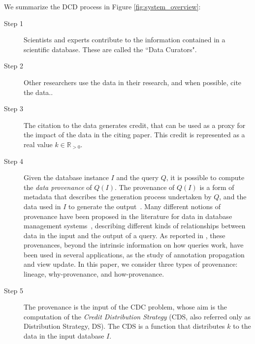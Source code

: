We summarize the DCD process in Figure \ref{fig:system_overview}:
\begin{description}
	\item[Step 1] Scientists and experts contribute to 
	the information contained in a scientific database.  These are called the ``Data Curators".  
	
	\item[Step 2] Other researchers use the data in their research, and when possible, cite the data..  
	\item[Step 3] The citation to the data generates credit, that can be used as a proxy for the impact of the data in the citing paper. This credit is represented as a real value $k \in \mathbb{R}_{>0}$. %
	\item[Step 4] Given the database instance $I$ and the query $Q$, it is possible to compute the \emph{data provenance} of $Q(I)$. The provenance of $Q(I)$ is a form of metadata that describes the generation process undertaken by $Q$, and the data used in $I$ to generate the output~\citep{CheneyProvSurvey}. Many different notions of provenance have been proposed in the literature for data in database management systems~\citep{lineageCui, WhyProvBuneman, howProvenanceGreen, dosso2020prov}, describing different kinds of relationships between data in the input and the output of a query. As reported in \citep{CheneyProvSurvey}, these provenances, beyond the intrinsic information on how queries work, have been used in several applications, as the study of annotation propagation and view update. In this paper, we consider three types of provenance: lineage, why-provenance, and how-provenance.
	\item[Step 5] The provenance is the input of the CDC problem, whose aim is the computation of the \emph{Credit Distribution Strategy} (CDS, also referred only as Distribution Strategy, DS). The CDS is a function that distributes $k$ to the data in the input database $I$. 

\end{description}
